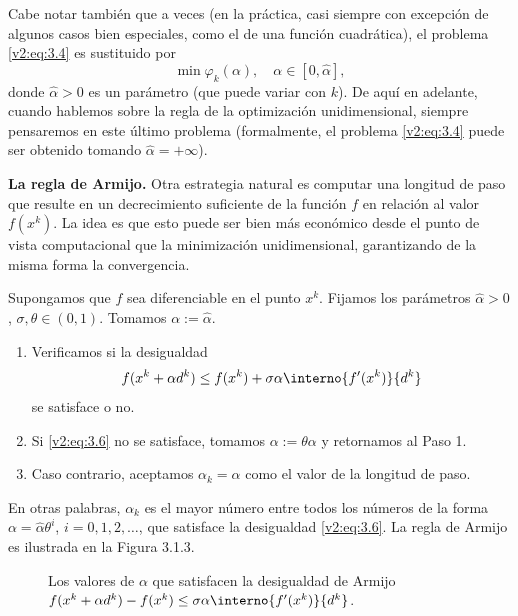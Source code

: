 Cabe notar también que a veces (en la práctica, casi siempre con excepción de algunos casos bien especiales, como el de una función cuadrática), el problema \eqref{v2:eq:3.4} es sustituido por
\[
    \min \varphi_k(\alpha), \quad \alpha \in [0, \hat{\alpha}],
\]
donde $\hat{\alpha} > 0$ es un parámetro (que puede variar con $k$). De aquí en adelante, cuando hablemos sobre la regla de la optimización unidimensional, siempre pensaremos en este último problema (formalmente, el problema \eqref{v2:eq:3.4} puede ser obtenido tomando $\hat{\alpha} = +\infty$).

\textbf{La regla de Armijo.} Otra estrategia natural es computar una longitud de paso que resulte en un decrecimiento suficiente de la función $f$ en relación al valor $f(x^k)$. La idea es que esto puede ser bien más económico desde el punto de vista computacional que la minimización unidimensional, garantizando de la misma forma la convergencia.

\begin{algorithm} \label{v2:alg:armijo}
    Supongamos que $f$ sea diferenciable en el punto $x^k$. Fijamos los parámetros $\hat{\alpha} > 0$, $\sigma, \theta \in (0, 1)$. Tomamos $\alpha := \hat{\alpha}$.
\begin{enumerate}
    \item Verificamos si la desigualdad
    \begin{equation}
        f(x^k + \alpha d^k) \le f(x^k) + \sigma \alpha \interno{f'(x^k)}{d^k}
        \label{v2:eq:3.6}
    \end{equation}
    se satisface o no.
    \item Si \eqref{v2:eq:3.6} no se satisface, tomamos $\alpha := \theta \alpha$ y retornamos al Paso 1.
    \item Caso contrario, aceptamos $\alpha_k = \alpha$ como el valor de la longitud de paso.
\end{enumerate}
\end{algorithm}

En otras palabras, $\alpha_k$ es el mayor número entre todos los números de la forma $\alpha = \hat{\alpha}\theta^i$, $i = 0, 1, 2, \dots$, que satisface la desigualdad \eqref{v2:eq:3.6}. La regla de Armijo es ilustrada en la Figura 3.1.3.

\begin{figure}[htpb]
    \centering
    \caption{Los valores de $\alpha$ que satisfacen la desigualdad de Armijo $f(x^k + \alpha d^k) - f(x^k) \le \sigma \alpha \interno{f'(x^k)}{d^k}$.}
    \label{v2:fig:3.1.3}
\end{figure}

